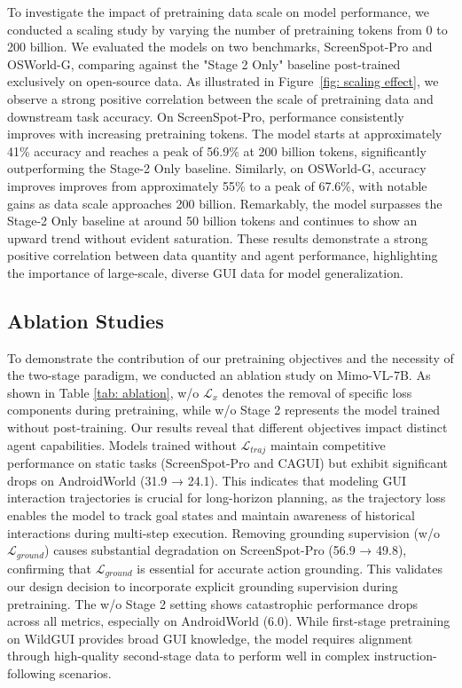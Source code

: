 \documentclass{article}
\theoremstyle{plain}
\theoremstyle{definition}
\theoremstyle{remark}
\begin{document}
To investigate the impact of pretraining data scale on model performance, we conducted a scaling study by varying the number of pretraining tokens from 0 to 200 billion. We evaluated the models on two benchmarks, ScreenSpot-Pro and OSWorld-G, comparing against the "Stage 2 Only" baseline post-trained exclusively on open-source data.
As illustrated in Figure~\ref{fig: scaling effect}, we observe a strong positive correlation between the scale of pretraining data and downstream task accuracy. On ScreenSpot-Pro, performance consistently improves with increasing pretraining tokens. The model starts at approximately 41\% accuracy and reaches a peak of 56.9\% at 200 billion tokens, significantly outperforming the Stage-2 Only baseline.
Similarly, on OSWorld-G, accuracy improves improves from approximately 55\% to a peak of 67.6\%, with notable gains as data scale approaches 200 billion. Remarkably, the model surpasses the Stage-2 Only baseline at around 50 billion tokens and continues to show an upward trend without evident saturation. These results demonstrate a strong positive correlation between data quantity and agent performance, highlighting the importance of large-scale, diverse GUI data for model generalization.

\subsection{Ablation Studies}

To demonstrate the contribution of our pretraining objectives and the necessity of the two-stage paradigm, we conducted an ablation study on Mimo-VL-7B. As shown in Table \ref{tab: ablation}, w/o $\mathcal{L}_{x}$ denotes the removal of specific loss components during pretraining, while w/o Stage 2 represents the model trained without post-training. 
Our results reveal that different objectives impact distinct agent capabilities. Models trained without $\mathcal{L}_{traj}$ maintain competitive performance on static tasks (ScreenSpot-Pro and CAGUI) but exhibit significant drops on AndroidWorld (31.9 → 24.1). This indicates that modeling GUI interaction trajectories is crucial for long-horizon planning, as the trajectory loss enables the model to track goal states and maintain awareness of historical interactions during multi-step execution.
Removing grounding supervision (w/o $\mathcal{L}_{ground}$) causes substantial degradation on ScreenSpot-Pro (56.9 → 49.8), confirming that $\mathcal{L}_{ground}$ is essential for accurate action grounding. This validates our design decision to incorporate explicit grounding supervision during pretraining.
The w/o Stage 2 setting shows catastrophic performance drops across all metrics, especially on AndroidWorld (6.0). While first-stage pretraining on WildGUI provides broad GUI knowledge, the model requires alignment through high-quality second-stage data to perform well in complex instruction-following scenarios. 
\end{document}

